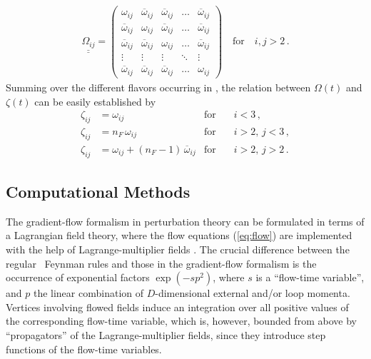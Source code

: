 \begin{equation}
	\begin{split}
		\underline{\underline{\Omega_{i j}}} =
		\begin{pmatrix}
			\omega_{i j} & \overline{\omega}_{i j} &
                        \overline{\omega}_{i j} & \dots &
                        \overline{\omega}_{i j} \\
			\overline{\omega}_{i j} & \omega_{i j} &
                        \overline{\omega}_{i j} & \dots &
                        \overline{\omega}_{i j} \\
			\overline{\omega}_{i j} & \overline{\omega}_{i j}
                        & \omega_{i j} & \dots & \overline{\omega}_{i j}
                        \\
			\vdots & \vdots & \vdots & \ddots & \vdots \\
			\overline{\omega}_{i j} & \overline{\omega}_{i
                          j} & \overline{\omega}_{i j} & \dots &
                        \omega_{i j}
		\end{pmatrix} \quad \text{for} \quad i,j > 2\, .
	\end{split}
\end{equation}
Summing over the different flavors occurring in , the
relation between $\Omega (t)$ and $\zeta (t)$ can be easily established
by
\begin{align}
	\zeta_{i j} &= \omega_{i j} & \text{for} &\quad i < 3 \, , \\
	\zeta_{i j} &= n_F \, \omega_{i j} & \text{for} &\quad i > 2, \, j < 3 \, , \\
	\zeta_{i j} &= \omega_{i j} + (n_F - 1) \, \overline{\omega}_{i j} & \text{for} &\quad i > 2, \, j > 2 \, .
\end{align}

\subsection{Computational Methods}

The gradient-flow formalism in perturbation theory can be formulated in
terms of a Lagrangian field theory, where the flow equations
(\ref{eq:flow}) are implemented with the help of Lagrange-multiplier
fields \cite{Luscher:2011bx}. The crucial difference between the regular
\qcd\ Feynman rules and those in the gradient-flow formalism is the
occurrence of exponential factors $\exp(-sp^2)$, where $s$ is a
``flow-time variable'', and $p$ the linear combination of
$D$-dimensional external and/or loop momenta. Vertices involving flowed
fields induce an integration over all positive values of the
corresponding flow-time variable, which is, however, bounded from above
by ``propagators'' of the Lagrange-multiplier fields, since they
introduce step functions of the flow-time variables.

